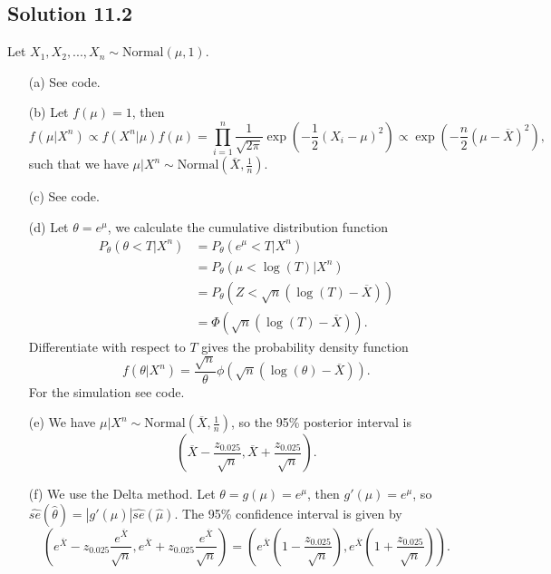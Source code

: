 \subsection*{Solution 11.2}

Let $X_1, X_2, ..., X_n \sim \mathrm{Normal}(\mu, 1)$.

\begin{itemize}
    \item[(a)] See code.
    \item[(b)] Let $f(\mu) = 1$, then
        \begin{equation*}
            f(\mu|X^n) \propto f(X^n|\mu) f(\mu)
                = \prod_{i = 1}^n \frac{1}{\sqrt{2\pi}} \exp\left(-\frac{1}{2}(X_i - \mu)^2\right)
                \propto \exp\left(-\frac{n}{2}(\mu - \overline{X})^2\right),
        \end{equation*}
        such that we have $\mu|X^n \sim \mathrm{Normal}(\overline{X}, \frac{1}{n})$.
    \item[(c)] See code.
    \item[(d)] Let $\theta = e^{\mu}$, we calculate the cumulative distribution function
        \begin{equation*}
            \begin{split}
                P_{\theta}(\theta < T | X^n)
                    &= P_{\theta}(e^{\mu} < T | X^n) \\
                    &= P_{\theta}(\mu < \log(T) | X^n) \\
                    &= P_{\theta}(Z < \sqrt{n}(\log(T) - \overline{X})) \\
                    &= \Phi(\sqrt{n}(\log(T) - \overline{X})).
            \end{split}
        \end{equation*}
        Differentiate with respect to $T$ gives the probability density function
        \begin{equation*}
            f(\theta|X^n) = \frac{\sqrt{n}}{\theta} \phi\left(\sqrt{n}(\log(\theta) - \overline{X})\right).
        \end{equation*}
        For the simulation see code.
    \item[(e)] We have $\mu|X^n \sim \mathrm{Normal}(\overline{X}, \frac{1}{n})$, so the 95\% posterior interval is
        \begin{equation*}
            \left(\overline{X} - \frac{z_{0.025}}{\sqrt{n}}, \overline{X} + \frac{z_{0.025}}{\sqrt{n}}\right).
        \end{equation*}
    \item[(f)] We use the Delta method.
        Let $\theta = g(\mu) = e^{\mu}$, then $g'(\mu) = e^{\mu}$, so $\hat{se}(\hat{\theta}) = |g'(\hat{\mu})|\hat{se}(\hat{\mu})$.
        The 95\% confidence interval is given by
        \begin{equation*}
            \left(e^{\overline{X}} - z_{0.025} \frac{e^{\overline{X}}}{\sqrt{n}}, e^{\overline{X}} + z_{0.025} \frac{e^{\overline{X}}}{\sqrt{n}}\right)
            = \left(e^{\overline{X}}(1 - \frac{z_{0.025}}{\sqrt{n}}), e^{\overline{X}}(1 + \frac{z_{0.025}}{\sqrt{n}})\right).
        \end{equation*}
\end{itemize}


